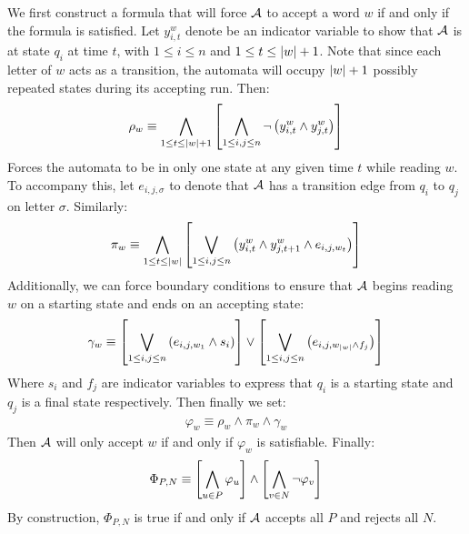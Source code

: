 \documentclass[12pt]{article}
\begin{document}
We first construct a formula that will force \(\mathcal{A}\) to accept
a word \(w\) if and only if the formula is satisfied.
Let \(y_{i, t}^w\) denote be an indicator variable
to show that \(\mathcal{A}\) is at state \(q_i\) at time \(t\),
with \(1 \leq i \leq n\) and \(1 \leq t \leq \left\lvert w\right\rvert + 1\).
Note that since each letter of \(w\) acts as a transition,
the automata will occupy \(\left\lvert w\right\rvert + 1\) possibly repeated
states during its accepting run.
Then:
\begin{align*}
  \rho_w \equiv
    \bigwedge_{1 \leq t \leq \left\lvert w\right\rvert + 1}
      \left[\bigwedge_{1 \leq i, j \leq n}
        \neg \left(y_{i, t} ^w \land y_{j, t} ^w\right)\right]
\end{align*}
Forces the automata to be in only one state at any given time \(t\)
while reading \(w\).
To accompany this, let \(e_{i, j, \sigma}\) to denote
that \(\mathcal{A}\) has a transition edge from \(q_i\) to \(q_j\)
on letter \(\sigma\).
Similarly:
\begin{align*}
  \pi_w \equiv
    \bigwedge_{1 \leq t \leq \left\lvert w\right\rvert}
      \left[\bigvee_{1 \leq i, j \leq n}
      \left(y_{i, t} ^w \land y_{j, t + 1} ^w \land e_{i, j, w_t}\right)\right]
\end{align*}
Additionally, we can force boundary conditions to ensure that \(\mathcal{A}\)
begins reading \(w\) on a starting state and ends on an accepting state:
\begin{align*}
  \gamma_{w} \equiv
    \left[\bigvee_{1 \leq i, j \leq n}
        \left(e_{i, j, w_{1}} \land s_i\right)\right]
      \lor
    \left[\bigvee_{1 \leq i, j \leq n}
        \left(e_{i, j, w_{\left\lvert w\right\rvert} \land f_j}\right)\right]
\end{align*}
Where \(s_i\) and \(f_j\) are indicator variables to express that
\(q_i\) is a starting state and \(q_j\) is a final state respectively.
Then finally we set:
\begin{align*}
  \varphi_{w} \equiv \rho_w \land \pi_w \land \gamma_w
\end{align*}
Then \(\mathcal{A}\) will only accept \(w\) if and only if \(\varphi_w\)
is satisfiable.
Finally:
\begin{align*}
  \Phi_{P, N} \equiv
    \left[\bigwedge_{u \in P} \varphi_u\right]
      \land
    \left[\bigwedge_{v \in N} \neg \varphi_v\right]
\end{align*}
By construction, \(\Phi_{P, N}\) is true if and only if \(\mathcal{A}\)
accepts all \(P\) and rejects all \(N\).


\end{document}
